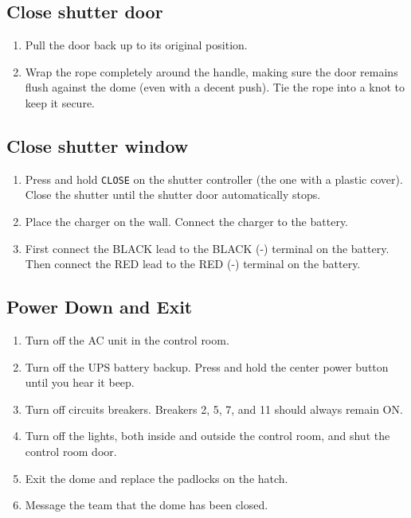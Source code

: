 \documentclass{article}
\begin{document}
	\subsection{Close shutter door}
	\label{sec:close-shutter-door}
	
	\begin{enumerate}
		
		\item Pull the door back up to its original position.
		
		\item Wrap the rope completely around the handle, making sure the door remains flush against the dome (even with a decent push). Tie the rope into a knot to keep it secure.
		
	\end{enumerate}
	
	\subsection{Close shutter window}
	\label{sec:close-shutter-window}
	
	\begin{enumerate}
		
		\item Press and hold \texttt{CLOSE} on the shutter controller (the one with a plastic cover). Close the shutter until the shutter door automatically stops.

		\item Place the charger on the wall. Connect the charger to the battery.
		
		\item First connect the BLACK lead to the BLACK (-) terminal on the battery. Then connect the RED lead to the RED (-) terminal on the battery.
		
	\end{enumerate}
	
	\subsection{Power Down and Exit}
	\label{sec:power-down-and-exit}
	
	\begin{enumerate}
		
		\item Turn off the AC unit in the control room.
		
		\item Turn off the UPS battery backup. Press and hold the center power button until you hear it beep.
		
		\item Turn off circuits breakers. Breakers 2, 5, 7, and 11 should always remain ON.
		
		\item Turn off the lights, both inside and outside the control room, and shut the control room door.
		
		\item Exit the dome and replace the padlocks on the hatch.
		
		\item Message the team that the dome has been closed.
		
	\end{enumerate}
\end{document}
